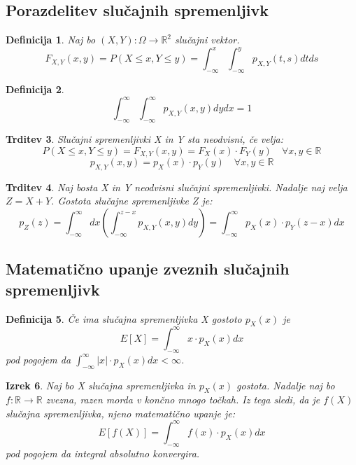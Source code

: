 \documentclass[11pt]{article}
\newtheorem{Izrek}{{\sc Izrek}}[section]
\newtheorem{Trditev}[Izrek]{{\sc Trditev}}
\newtheorem{Definicija}[Izrek]{{\sc Definicija}}
\begin{document}
\subsection{Porazdelitev slučajnih spremenljivk}
\begin{Definicija}
	Naj bo $(X,Y) : \Omega \to \mathbb{R}^2$ slučajni vektor.
	$$F_{X,Y}(x,y) = P(X\le x, Y\le y) = \int_{-\infty}^{x}\int_{-\infty}^{y}{p_{X,Y}(t,s) dt ds}$$
\end{Definicija}
\begin{Definicija}
	$$\int_{-\infty}^{\infty}\int_{-\infty}^{\infty}{p_{X,Y}(x,y) dy dx} = 1$$
\end{Definicija}
\begin{Trditev}
	Slučajni spremenljivki X in Y sta neodvisni, če velja:
	$$P(X\le x, Y\le y) =F_{X,Y}(x,y) =F_X(x) \cdot F_Y(y) \quad \forall x,y\in \mathbb{R}$$
	$$p_{X,Y} (x,y) =p_X(x) \cdot p_Y(y) \quad \forall x,y\in \mathbb{R}$$
\end{Trditev}
\begin{Trditev}
	Naj bosta X in Y neodvisni slučajni spremenljivki. Nadalje naj velja $Z = X + Y$. Gostota slučajne spremenljivke Z je:
	$$p_Z(z) = \int_{-\infty}^{\infty}{dx}\left(\int_{-\infty}^{z-x}{p_{X,Y}(x,y) dy}\right) = \int_{-\infty}^{\infty}{p_X(x)\cdot p_Y(z-x)dx}$$
\end{Trditev}
\subsection{Matematično upanje zveznih slučajnih spremenljivk}
\begin{Definicija}
Če ima slučajna spremenljivka X gostoto $p_X(x)$ je $$E[X] = \int_{-\infty}^{\infty}{x\cdot p_X(x) dx}$$  pod pogojem da $\int_{-\infty}^{\infty}{|x| \cdot p_X(x) dx} < \infty$.
\end{Definicija}
\begin{Izrek}
Naj bo X slučajna spremenljivka in $p_X(x)$ gostota. Nadalje naj bo $f: \mathbb{R} \to \mathbb{R}$ zvezna, razen morda v končno mnogo točkah. Iz tega sledi, da je $f(X)$ slučajna spremenljivka, njeno matematično upanje je:
$$E[f(X)] =  \int_{-\infty}^{\infty}{f(x)\cdot p_X(x) dx}$$
pod pogojem da integral absolutno konvergira.
\end{Izrek}
\end{document}
